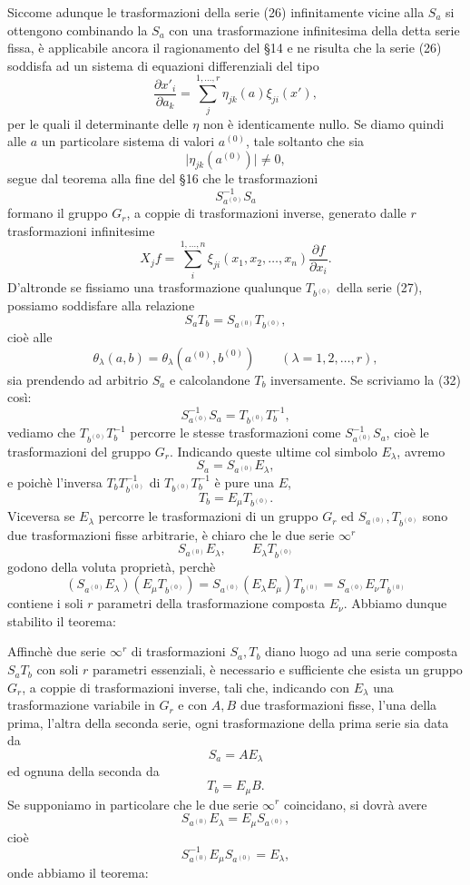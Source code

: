 \documentclass[11pt]{book}
\begin{document}
Siccome adunque le trasformazioni della serie (26) infinitamente vicine alla $S_a$ si ottengono combinando la $S_a$ con una trasformazione infinitesima della detta serie fissa, è applicabile ancora il ragionamento del \S{}14 e ne risulta che la serie (26) soddisfa ad un sistema di equazioni differenziali del tipo
\[
 \frac{\partial x'_i}{\partial a_k}=\sum\limits_j^{1,\ldots,r}\eta_{jk}(a)\xi_{ji}(x'),
\]
per le quali il determinante delle $\eta$ non è identicamente nullo. Se diamo quindi alle $a$ un particolare sistema di valori $a^{(0)}$, tale soltanto che sia
\[
 \lvert\eta_{jk}(a^{(0)})\rvert\ne0,
\]
segue dal teorema alla fine del \S{}16 che le trasformazioni
\[
 S_{a^{(0)}}^{-1}S_a
\]
formano il gruppo $G_r$, a coppie di trasformazioni inverse, generato dalle $r$ trasformazioni infinitesime
\[
 X_j f=\sum\limits_i^{1,\ldots,n}\xi_{ji}(x_1,x_2,\ldots,x_n)\frac{\partial f}{\partial x_i}.
\]
D'altronde se fissiamo una trasformazione qualunque $T_{b^{(0)}}$ della serie (27), possiamo soddisfare alla relazione
\[
 S_aT_b=S_{a^{(0)}}T_{b^{(0)}},
\]
cioè alle
\begin{equation*}\tag{32}
 \theta_\lambda(a,b)=\theta_\lambda(a^{(0)},b^{(0)})
 \qquad (\lambda=1,2,\ldots,r),
\end{equation*}
sia prendendo ad arbitrio $S_a$ e calcolandone $T_b$ inversamente. Se scriviamo la (32) così:
\[
 S_{a^{(0)}}^{-1}S_a=T_{b^{(0)}}T_b^{-1},
\]
vediamo che $T_{b^{(0)}}T_b^{-1}$ percorre le stesse trasformazioni come $S_{a^{(0)}}^{-1}S_a$, cioè le trasformazioni del gruppo $G_r$. Indicando queste ultime col simbolo $E_\lambda$, avremo
\[
 S_a=S_{a^{(0)}}E_\lambda,
\]
e poichè l'inversa $T_bT_{b^{(0)}}^{-1}$ di $T_{b^{(0)}}T_b^{-1}$ è pure una $E$,
\[
 T_b=E_\mu T_{b^{(0)}}.
\]
Viceversa se $E_\lambda$ percorre le trasformazioni di un gruppo $G_r$ ed $S_{a^{(0)}},T_{b^{(0)}}$ sono due trasformazioni fisse arbitrarie, è chiaro che le due serie $\infty^r$
\[
 S_{a^{(0)}}E_\lambda,
 \qquad
 E_\lambda T_{b^{(0)}}
\]
godono della voluta proprietà, perchè
\[
 (S_{a^{(0)}}E_\lambda)(E_\mu T_{b^{(0)}})
 =S_{a^{(0)}}(E_\lambda E_\mu)T_{b^{(0)}}
 =S_{a^{(0)}}E_\nu T_{b^{(0)}}
\]
contiene i soli $r$ parametri della trasformazione composta $E_\nu$. Abbiamo dunque stabilito il teorema:

Affinchè due serie $\infty^r$ di trasformazioni $S_a,T_b$ diano luogo ad una serie composta $S_aT_b$ con soli $r$ parametri essenziali, è necessario e sufficiente che esista un gruppo $G_r$, a coppie di trasformazioni inverse, tali che, indicando con $E_\lambda$ una trasformazione variabile in $G_r$ e con $A,B$ due trasformazioni fisse, l'una della prima, l'altra della seconda serie, ogni trasformazione della prima serie sia data da
\[
 S_a=AE_\lambda
\]
ed ognuna della seconda da
\[
 T_b=E_\mu B.
\]
Se supponiamo in particolare che le due serie $\infty^r$ coincidano, si dovrà avere
\[
 S_{a^{(0)}}E_\lambda=E_\mu S_{a^{(0)}},
\]
cioè
\[
 S_{a^{(0)}}^{-1}E_\mu S_{a^{(0)}}=E_\lambda,
\]
onde abbiamo il teorema:
\end{document}
